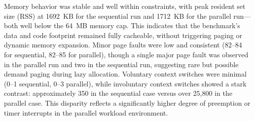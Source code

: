 


Memory behavior was stable and well within constraints, with peak resident set size (RSS) at 1692~KB for the sequential run and 1712~KB for the parallel run—both well below the 64~MB memory cap. This indicates that the benchmark’s data and code footprint remained fully cacheable, without triggering paging or dynamic memory expansion. Minor page faults were low and consistent (82--84 for sequential, 82--85 for parallel), though a single major page fault was observed in the parallel run and two in the sequential run, suggesting rare but possible demand paging during lazy allocation. Voluntary context switches were minimal (0--1 sequential, 0--3 parallel), while involuntary context switches showed a stark contrast: approximately 350 in the sequential case versus over 25,800 in the parallel case. This disparity reflects a significantly higher degree of preemption or timer interrupts in the parallel workload environment.



